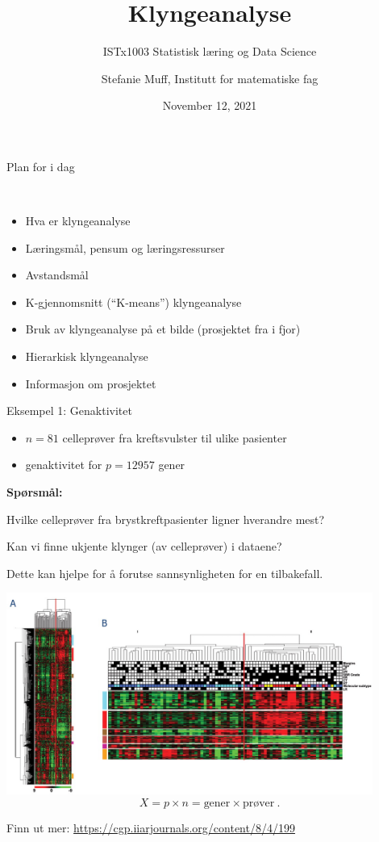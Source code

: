 \documentclass[10pt,ignorenonframetext,]{beamer}
\title{Klyngeanalyse}
\subtitle{ISTx1003 Statistisk læring og Data Science}
\author{Stefanie Muff, Institutt for matematiske fag}
\date{November 12, 2021}
\begin{document}
\frame{\titlepage}

\begin{frame}{Plan for i dag}
\protect\hypertarget{plan-for-i-dag}{}

\(~\)

\begin{itemize}
\item
  Hva er klyngeanalyse
\item
  Læringsmål, pensum og læringsressurser
\item
  Avstandsmål
\item
  K-gjennomsnitt (``K-means'') klyngeanalyse
\item
  Bruk av klyngeanalyse på et bilde (prosjektet fra i fjor)
\item
  Hierarkisk klyngeanalyse
\item
  Informasjon om prosjektet
\end{itemize}

\end{frame}

\begin{frame}{Eksempel 1: Genaktivitet}
\protect\hypertarget{eksempel-1-genaktivitet}{}

\begin{itemize}
\item
  \(n=81\) celleprøver fra kreftsvulster til ulike pasienter
\item
  genaktivitet for \(p =12957\) gener
\end{itemize}

\vspace{2mm}

\textbf{Spørsmål:}

Hvilke celleprøver fra brystkreftpasienter ligner hverandre mest?

Kan vi finne ukjente klynger (av celleprøver) i dataene?

Dette kan hjelpe for å forutse sannsynligheten for en tilbakefall.

\end{frame}

\begin{frame}

\centering

\includegraphics[width=0.9\textwidth,height=\textheight]{gene_expression.jpg}
\[ X = p\times n  =  \text{gener} \times \text{prøver}  \ .\]

\tiny

Finn ut mer: \url{https://cgp.iiarjournals.org/content/8/4/199}

\end{frame}
\end{document}
